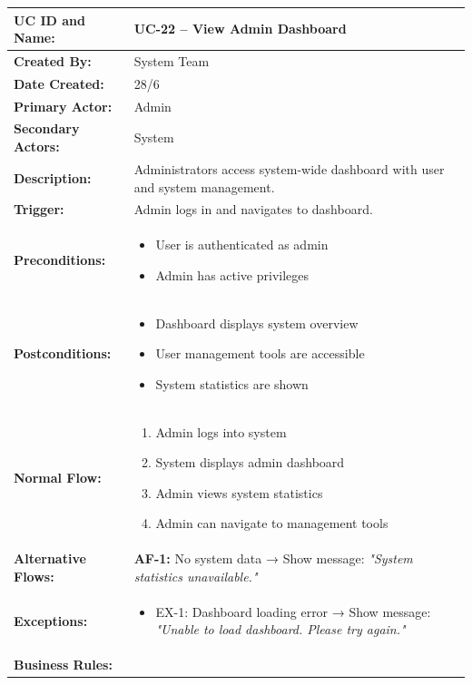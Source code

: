 \documentclass[12pt,a4paper]{article}
\begin{document}
\renewcommand{\arraystretch}{1.5}
\begin{longtable}{|p{4.5cm}|p{10.5cm}|}
\hline
\textbf{UC ID and Name:} & UC-22 – View Admin Dashboard \\
\hline
\textbf{Created By:} & System Team \\
\hline
\textbf{Date Created:} & 28/6 \\
\hline
\textbf{Primary Actor:} & Admin \\
\hline
\textbf{Secondary Actors:} & System \\
\hline
\textbf{Description:} & Administrators access system-wide dashboard with user and system management. \\
\hline
\textbf{Trigger:} & Admin logs in and navigates to dashboard. \\
\hline
\textbf{Preconditions:} &
\begin{itemize}
  \item User is authenticated as admin
  \item Admin has active privileges
\end{itemize} \\
\hline
\textbf{Postconditions:} &
\begin{itemize}
  \item Dashboard displays system overview
  \item User management tools are accessible
  \item System statistics are shown
\end{itemize} \\
\hline
\textbf{Normal Flow:} &
\begin{enumerate}
  \item Admin logs into system
  \item System displays admin dashboard
  \item Admin views system statistics
  \item Admin can navigate to management tools
\end{enumerate} \\
\hline
\textbf{Alternative Flows:} &
\textbf{AF-1:} No system data → Show message: \textit{"System statistics unavailable."} \\
\hline
\textbf{Exceptions:} &
\begin{itemize}
  \item EX-1: Dashboard loading error → Show message: \textit{"Unable to load dashboard. Please try again."}
\end{itemize} \\
\hline
\textbf{Business Rules:} &

\end{longtable}
\end{document}
